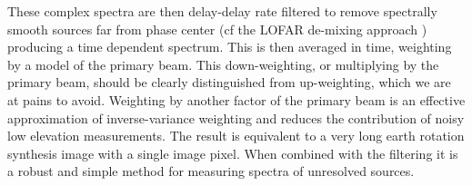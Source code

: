 \documentclass[preprint]{aastex}
\begin{document}



 These complex spectra are then delay-delay rate filtered to remove spectrally
smooth sources far from phase center \citep{Parsons:2009p7859} (cf the LOFAR
de-mixing approach \cite{Offringa:2012p9691})  producing a time dependent
spectrum. This is then averaged in time,  weighting by a model of the primary
beam. This down-weighting, or multiplying by the primary beam, should be
clearly distinguished from up-weighting, which we are at pains to avoid.
Weighting by another factor of the primary beam is an effective approximation
of inverse-variance weighting \citep{Pober:2012p8800} and reduces the
contribution of noisy low elevation measurements.  The result is equivalent to
a very long earth rotation synthesis image with a single image pixel. When
combined with the filtering it is a robust and simple method for measuring
spectra of unresolved sources. 

\end{document}
